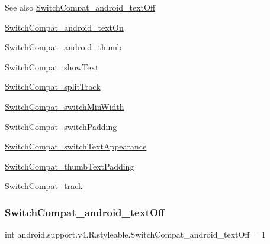 \begin{DoxySeeAlso}{See also}
\hyperlink{classandroid_1_1support_1_1v4_1_1R_1_1styleable_ab9ffea56b6dc29ec8c9df5f7f58bcdf4}{Switch\+Compat\+\_\+android\+\_\+text\+Off} 

\hyperlink{classandroid_1_1support_1_1v4_1_1R_1_1styleable_ab130695aad0fe2adc831a887079ac3cf}{Switch\+Compat\+\_\+android\+\_\+text\+On} 

\hyperlink{classandroid_1_1support_1_1v4_1_1R_1_1styleable_a3e61ded8a9be801503c52b0b981e60ef}{Switch\+Compat\+\_\+android\+\_\+thumb} 

\hyperlink{classandroid_1_1support_1_1v4_1_1R_1_1styleable_afd7664e77fd28cb758f94f37079b87bf}{Switch\+Compat\+\_\+show\+Text} 

\hyperlink{classandroid_1_1support_1_1v4_1_1R_1_1styleable_ac1b201bc3080cd31d6a4579fb95a0af7}{Switch\+Compat\+\_\+split\+Track} 

\hyperlink{classandroid_1_1support_1_1v4_1_1R_1_1styleable_a1b72b7cb596d02dd5a8d98490dbe1a50}{Switch\+Compat\+\_\+switch\+Min\+Width} 

\hyperlink{classandroid_1_1support_1_1v4_1_1R_1_1styleable_a0e255dd7f9b8259683f42c6b46188916}{Switch\+Compat\+\_\+switch\+Padding} 

\hyperlink{classandroid_1_1support_1_1v4_1_1R_1_1styleable_ab4c597f326c0384743a43b0b9438e39c}{Switch\+Compat\+\_\+switch\+Text\+Appearance} 

\hyperlink{classandroid_1_1support_1_1v4_1_1R_1_1styleable_adc6c78ef9566075a82031ccba51bd4ea}{Switch\+Compat\+\_\+thumb\+Text\+Padding} 

\hyperlink{classandroid_1_1support_1_1v4_1_1R_1_1styleable_a4f27b8668dcf466d20fa43564df8cd81}{Switch\+Compat\+\_\+track} 
\end{DoxySeeAlso}
\mbox{\label{classandroid_1_1support_1_1v4_1_1R_1_1styleable_ab9ffea56b6dc29ec8c9df5f7f58bcdf4}} 
\subsubsection{\texorpdfstring{Switch\+Compat\+\_\+android\+\_\+text\+Off}{SwitchCompat\_android\_textOff}}
{\footnotesize\ttfamily int android.\+support.\+v4.\+R.\+styleable.\+Switch\+Compat\+\_\+android\+\_\+text\+Off = 1\hspace{0.3cm}{\ttfamily [static]}}

